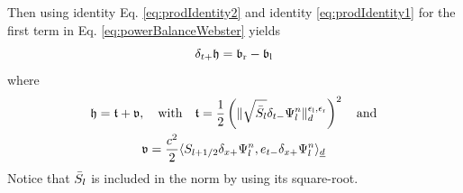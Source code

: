 {Then using identity Eq. \eqref{eq:prodIdentity2} and identity \eqref{eq:prodIdentity1} for the first term in Eq. \eqref{eq:powerBalanceWebster} yields 
\begin{equation*}
    \delta_{t+} \mathfrak{h} = \mathfrak{b}_\text{r} - \mathfrak{b}_\text{l}
\end{equation*}
where
\begin{equation}\label{eq:energyBalanceWebster}
    \begin{gathered}
        \mathfrak{h} = \mathfrak{t} + \mathfrak{v}, \quad \text{with} \quad \mathfrak{t} = \frac{1}{2} \left(\lVert\sqrt{\bar{S}_l} \delta_{t-} \Psi_l^n \rVert_d^{\epsilon_\text{l}, \epsilon_\text{r}}\right)^2 \quad \text{and} \\
        \mathfrak{v} = \frac{c^2}{2}\langle S_{l+1/2}\delta_{x+} \Psi_l^n, e_{t-}\delta_{x+}\Psi_l^n\rangle_{\underline{d}}
    \end{gathered}
\end{equation}
Notice that $\bar{S}_l$ is included in the norm by using its square-root.

}
